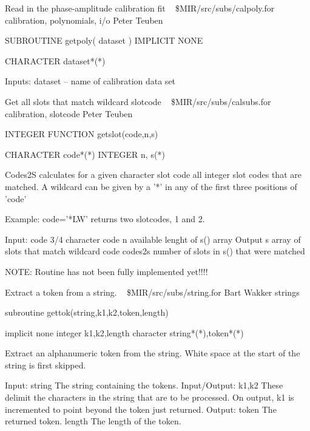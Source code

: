 %
\noindent Read in the phase-amplitude calibration fit
\newline \ 
\newline {} \$MIR/src/subs/calpoly.for
\newline {} calibration, polynomials, i/o
\newline {} Peter Teuben
\par{\tenpoint
{\eightpoint\begintt
        SUBROUTINE getpoly( dataset )
        IMPLICIT NONE

        CHARACTER dataset*(*)

  Inputs:
       dataset -- name of calibration data set
\endtt}
\par}
%
\noindent Get all slots that match wildcard slotcode
\newline \ 
\newline {} \$MIR/src/subs/calsubs.for
\newline {} calibration, slotcode
\newline \abox{Responsible:} Peter Teuben
\par{\tenpoint
{\eightpoint\begintt
        INTEGER FUNCTION getslot(code,n,s)

        CHARACTER code*(*)
        INTEGER   n, s(*)

    Codes2S calculates for a given character slot code all
    integer slot codes that are matched. A wildcard can be
    given by a '*' in any of the first three positions of
    'code'

    Example: code='*LW' returns two slotcodes, 1 and 2.

    Input:
       code    3/4 character code
       n       available lenght of s() array
    Output
       s       array of slots that match wildcard code
       codes2s number of slots in s() that were matched

   NOTE: Routine has not been fully implemented yet!!!!
\endtt}
\par}
%
\noindent Extract a token from a string.
\newline \ 
\newline {} \$MIR/src/subs/string.for
\newline \abox{Responsible:} Bart Wakker
\newline {} strings
\par{\tenpoint
{\eightpoint\begintt
        subroutine gettok(string,k1,k2,token,length)

        implicit none
        integer k1,k2,length
        character string*(*),token*(*)

  Extract an alphanumeric token from the string. White space at the
  start of the string is first skipped.

  Input:
    string     The string containing the tokens.
  Input/Output:
    k1,k2      These delimit the characters in the string that are
               to be processed. On output, k1 is incremented to point
               beyond the token just returned.
  Output:
    token      The returned token.
    length     The length of the token.
\endtt}
\par}
